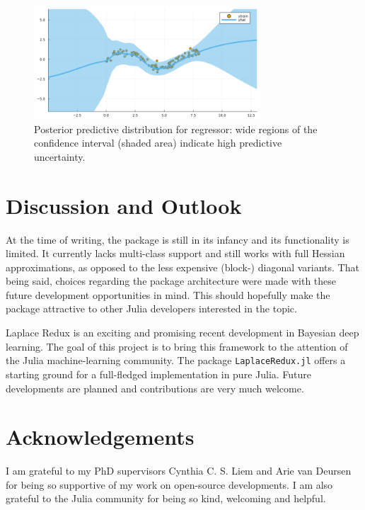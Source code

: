 \documentclass{juliacon}
\begin{document}
\begin{figure}

{\centering \includegraphics[width=3.33333in,height=1.66667in]{www/regression.png}

}

\caption{\label{fig-reg}Posterior predictive distribution for regressor:
wide regions of the confidence interval (shaded area) indicate high
predictive uncertainty.}

\end{figure}

\hypertarget{sec-con}{%
\section{Discussion and Outlook}\label{sec-con}}

At the time of writing, the package is still in its infancy and its
functionality is limited. It currently lacks multi-class support and
still works with full Hessian approximations, as opposed to the less
expensive (block-) diagonal variants. That being said, choices regarding
the package architecture were made with these future development
opportunities in mind. This should hopefully make the package attractive
to other Julia developers interested in the topic.

Laplace Redux is an exciting and promising recent development in
Bayesian deep learning. The goal of this project is to bring this
framework to the attention of the Julia machine-learning community. The
package \texttt{LaplaceRedux.jl} offers a starting ground for a
full-fledged implementation in pure Julia. Future developments are
planned and contributions are very much welcome.

\hypertarget{sec-ack}{%
\section{Acknowledgements}\label{sec-ack}}

I am grateful to my PhD supervisors Cynthia C. S. Liem and Arie van
Deursen for being so supportive of my work on open-source developments.
I am also grateful to the Julia community for being so kind, welcoming
and helpful.


  
\end{document}
